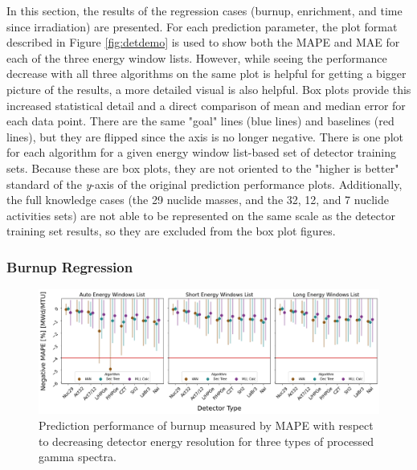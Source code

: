 
In this section, the results of the regression cases (burnup, enrichment, and
time since irradiation) are presented. For each prediction parameter, the plot
format described in Figure \ref{fig:detdemo} is used to show both the
\gls{MAPE} and \gls{MAE} for each of the three energy window lists.  However,
while seeing the performance decrease with all three algorithms on the same
plot is helpful for getting a bigger picture of the results, a more detailed
visual is also helpful. Box plots provide this increased statistical detail and
a direct comparison of mean and median error for each data point. There are the
same "goal" lines (blue lines) and baselines (red lines), but they are flipped
since the axis is no longer negative.  There is one plot for each algorithm for
a given energy window list-based set of detector training sets.  Because these
are box plots, they are not oriented to the "higher is better" standard of the
\textit{y}-axis of the original prediction performance plots. Additionally, the
full knowledge cases (the 29 nuclide masses, and the 32, 12, and 7 nuclide
activities sets) are not able to be represented on the same scale as the
detector training set results, so they are excluded from the box plot figures. 

\subsubsection{Burnup Regression}

\begin{figure}[!htb]
  \centering
  \includegraphics[width=\textwidth]{./chapters/exp2/detector_preds_wrt_enlist_MAPE_burn.png}
  \caption{Prediction performance of burnup measured by \gls{MAPE} with 
           respect to decreasing detector energy resolution for three types 
           of processed gamma spectra.}
  \label{fig:burn}
\end{figure}

